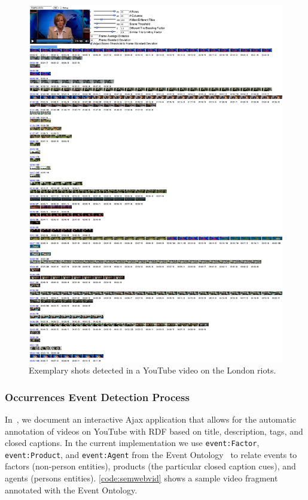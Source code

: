 \documentclass[runningheads,a4paper]{llncs}
\begin{document}
\begin{figure}[htb!]
\begin{center}
   \includegraphics[width=0.7\linewidth]{./resources/london}
\end{center}
   \caption{Exemplary shots detected in a YouTube video on the London riots.}
\label{fig:shots}
\end{figure}

\subsubsection{Occurrences Event Detection Process}
In~\cite{semwebvid}, we document an interactive Ajax application that allows for the automatic annotation of videos on YouTube with RDF based on title, description, tags, and closed captions. In the current implementation we use \texttt{event:Factor}, \texttt{event:Product}, and \texttt{event:Agent} from the Event Ontology~\cite{Raimond:Event} to relate events to factors (non-person entities), products (the particular closed caption cues), and agents (persons entities). \autoref{code:semwebvid} shows a sample video fragment annotated with the Event Ontology.
\end{document}

